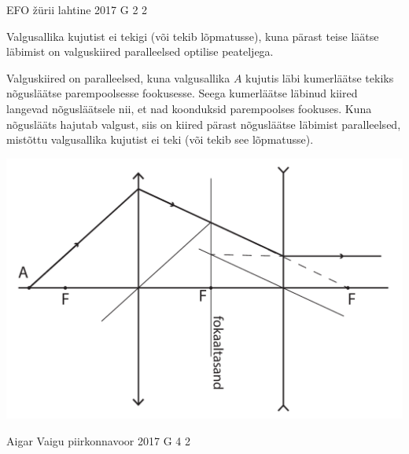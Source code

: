\documentclass[11pt]{article}
\begin{document}
{{\fi
}

{EFO žürii} %
{lahtine} %
{2017} %
{G 2} %
{2} %
{

\ifSolution
Valgusallika kujutist ei tekigi (või tekib lõpmatusse), kuna pärast teise läätse läbimist on valguskiired paralleelsed optilise peateljega.

Valguskiired on paralleelsed, kuna valgusallika $A$ kujutis läbi kumerläätse tekiks nõgusläätse parempoolsesse fookusesse. Seega kumerläätse läbinud kiired langevad nõgusläätsele nii, et nad koonduksid parempoolses fookuses. Kuna nõguslääts hajutab valgust, siis on kiired pärast nõgusläätse läbimist paralleelsed, mistõttu valgusallika kujutist ei teki (või tekib see lõpmatusse).

\begin{center}
	\includegraphics[width=0.7\linewidth]{2017-lahg-02-valgusallikaslah}
\end{center}
\fi
}

{Aigar Vaigu} %
{piirkonnavoor} %
{2017} %
{G 4} %
{2} %
{

}}
\end{document}
